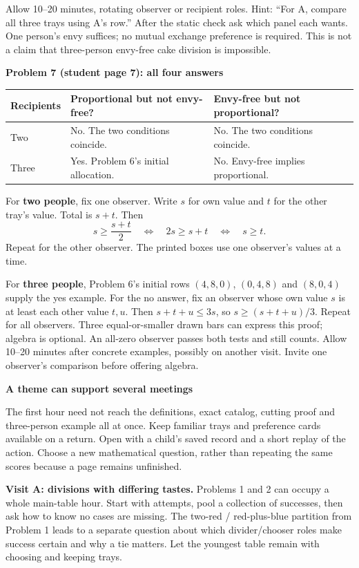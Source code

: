 \documentclass[11pt]{article}
\newcommand{\heading}[1]{\par\vspace{1.5mm}{\large\bfseries #1}\par\vspace{.8mm}}
\newcommand{\subhead}[1]{\par\vspace{1mm}\textbf{#1}\par}
\newcommand{\page}[1]{\newpage\heading{#1}}
\begin{document}
Allow 10--20 minutes, rotating observer or recipient roles. Hint: ``For A, compare all three trays using A's row.'' After the static check ask which panel each wants. One person's envy suffices; no mutual exchange preference is required. This is not a claim that three-person envy-free cake division is impossible.

\subhead{Problem 7 (student page 7): all four answers}
\begin{tabularx}{\linewidth}{@{}L{24mm}L{53mm}X@{}}\toprule
Recipients & Proportional but not envy-free? & Envy-free but not proportional?\\\midrule
Two & No. The two conditions coincide. & No. The two conditions coincide.\\
Three & Yes. Problem 6's initial allocation. & No. Envy-free implies proportional.\\\bottomrule
\end{tabularx}

For \textbf{two people}, fix one observer. Write $s$ for own value and $t$ for the other tray's value. Total is $s+t$. Then
\[
 s\ge\frac{s+t}{2}\quad\Longleftrightarrow\quad 2s\ge s+t
 \quad\Longleftrightarrow\quad s\ge t.
\]
Repeat for the other observer. The printed boxes use one observer's values at a time.

For \textbf{three people}, Problem 6's initial rows $(4,8,0)$, $(0,4,8)$ and $(8,0,4)$ supply the yes example. For the no answer, fix an observer whose own value $s$ is at least each other value $t,u$. Then $s+t+u\le3s$, so $s\ge(s+t+u)/3$. Repeat for all observers. Three equal-or-smaller drawn bars can express this proof; algebra is optional. An all-zero observer passes both tests and still counts. Allow 10--20 minutes after concrete examples, possibly on another visit. Invite one observer's comparison before offering algebra.

\page{Return visits, extensions and what to record}
\subhead{A theme can support several meetings}
The first hour need not reach the definitions, exact catalog, cutting proof and three-person example all at once. Keep familiar trays and preference cards available on a return. Open with a child's saved record and a short replay of the action. Choose a new mathematical question, rather than repeating the same scores because a page remains unfinished.

\textbf{Visit A: divisions with differing tastes.} Problems 1 and 2 can occupy a whole main-table hour. Start with attempts, pool a collection of successes, then ask how to know no cases are missing. The two-red / red-plus-blue partition from Problem 1 leads to a separate question about which divider/chooser roles make success certain and why a tie matters. Let the youngest table remain with choosing and keeping trays.
\end{document}

